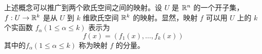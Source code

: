 %
%
%
%        
%

上述概念可以推广到两个欧氏空间之间的映射。设 $U$ 是 $\mathbb{R}^n$ 的一个开子集，$f: U \to \mathbb{R}^k$ 是从 $U$ 到 $k$ 维欧氏空间 $\mathbb{R}^k$ 的映射。显然，映射 $f$ 可以用 $U$ 上的 $k$ 个实函数 
$f_\alpha (1 \le \alpha \le k)$ 表示为 
$$f(x) = (f_1(x), \dots, f_k(x))$$
其中的$f_\alpha (1 \le \alpha \le k)$ 称为映射 $f$ 的分量。

